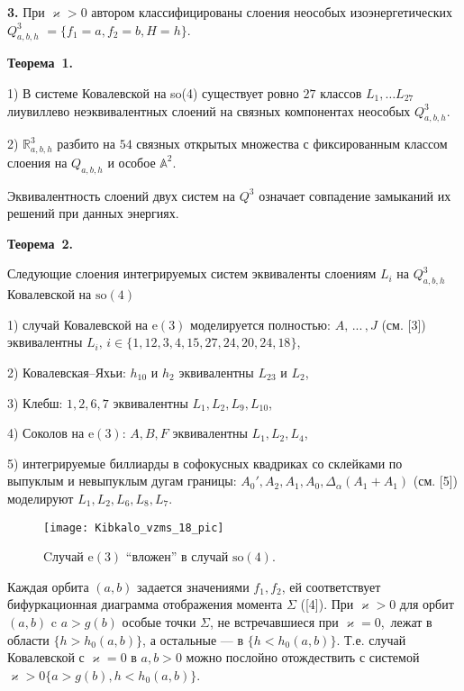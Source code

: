 {%
\textbf{3.} При $\varkappa >0$ автором классифицированы слоения неособых изоэнергетических $Q^3_{a,b,h}$ $=\{f_1=a,f_2=b,H=h\}.$

\textbf{Теорема~1.}{
1) В системе Ковалевской на so(4) существует ровно $27$ классов $L_1, \dots L_{27}$ лиувиллево неэквивалентных слоений на связных компонентах неособых $Q^3_{a, b, h}$.%

2) $\mathbb{R}^3_{a, b, h}$ разбито на $54$ связных открытых множества с фиксированным классом слоения на $Q_{a, b, h}$ и особое $\mathbb{A}^2$.
}

Эквивалентность слоений двух систем на $Q^3$ означает совпадение замыканий их решений при данных энергиях.

\textbf{Теорема~2.}{
Следующие слоения интегрируемых систем эквиваленты слоениям $L_i$ на $Q^3_{a, b, h}$ Ковалевской на $\mathrm{so}(4)$

1) случай Ковалевской на $\mathrm{e}(3)$  моделируется полностью:
$A,\, ...\, ,J$ (см. [3]) эквивалентны $L_i,\, i \in \{1, 12, 3, 4, 15, 27, 24, 20, 24, 18\}$, %

2) Ковалевская--Яхьи: $h_{10}$ и $h_{2}$ эквивалентны $L_{23}$ и  $L_2$,

3) Клебш:  $1, 2, 6, 7$ эквивалентны $L_1, L_2, L_9, L_{10}$,

4) Соколов на $\mathrm{e}(3)$: $A, B, F$ эквивалентны $L_1, L_2, L_4$,

5) интегрируемые биллиарды в софокусных квадриках со склейками по выпуклым и невыпуклым дугам границы:
$A_0', A_2, A_1, A_0, \Delta_{\alpha}(A_1+A_1)$ (см. [5])  моделируют $L_1, L_2, L_6, L_8, L_7$.
}

\begin{figure}[!htb]
%
\begin{center}
\texttt{[image: Kibkalo\_vzms\_18\_pic]}
   \caption{Cлучай $\mathrm{e}(3)$ ``вложен'' в случай $\mathrm{so}(4)$.}
\endminipage
\end{center}
\end{figure}


Каждая орбита $(a, b)$ задается значениями $f_1, f_2$, ей соответствует бифуркационная диаграмма отображения момента $\Sigma$ ([4]).
При $\varkappa >0$ для орбит $(a, b)$ c $a >g(b)$ особые точки $\Sigma$, не встречавшиеся при $\varkappa = 0$,~лежат в области $\{h > h_0(a, b)\}$, а остальные --- в $\{h < h_0(a, b)\}$.
Т.е. случай Ковалевской с $\varkappa =0$ в $a, b >0$ можно послойно отождествить с системой $\varkappa >0 \{a >g(b), h < h_0(a, b)\}$.



}

